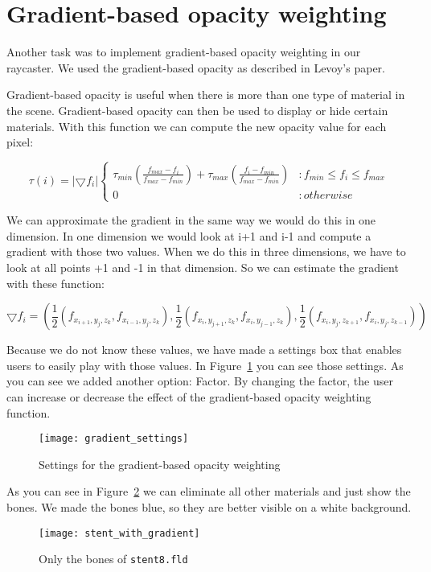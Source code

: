 \section{Gradient-based opacity weighting}\label{Sec:Gow}
Another task was to implement gradient-based opacity weighting in our raycaster.
We used the gradient-based opacity as described in Levoy’s paper.

Gradient-based opacity is useful when there is more than one type of  material in the scene. 
Gradient-based opacity can then be used to display or hide certain materials.
With this function we can compute the new opacity value for each pixel:

\[ \tau(i) = |\bigtriangledown f_{i}| \left\{
  \begin{array}{lr}
   \tau_{min} (\frac{ f_{max}- f_{i}}{ f_{max}- f_{min}}) +\tau_{max}( \frac{ f_{i}- f_{min}}{ f_{max}- f_{min}})  & : f_{min} \leq f_{i}  \leq f_{max} \\
    0 & : otherwise 
  \end{array}
\right.
\] 

We can approximate the gradient in the same way we would do this in one dimension. 
In one dimension we would look at i+1 and i-1 and compute a gradient with those two values.
When we do this in three dimensions, we have to look at all points +1 and -1 in that dimension.
So we can estimate the gradient with these function:

$$\bigtriangledown f_{i} = ( 
\frac{ 1}{2}( f_{x_{i+1},y_{j},z_{k}},f_{x_{i-1},y_{j},z_{k}} ),
\frac{ 1}{2}( f_{x_{i},y_{j+1},z_{k}},f_{x_{i},y_{j-1},z_{k}} ),
\frac{ 1}{2}( f_{x_{i},y_{j},z_{k+1}},f_{x_{i},y_{j},z_{k-1}} )) $$

Because we do not know these values, we have made a settings box that enables users to easily play with those values.
In Figure~\ref{fig:gradient_settings} you can see those settings. 
As you can see we added another option: Factor. 
By changing the factor, the user can increase or decrease the effect of the gradient-based opacity weighting function.

\begin{figure}[H]
	\centering
		\texttt{[image: gradient\_settings]}
		\caption{Settings for the gradient-based opacity weighting}
	\label{fig:gradient_settings}
\end{figure}

As you can see in Figure~\ref{fig:gradient} we can eliminate all other materials and just show the bones.
We made the bones blue, so they are better visible on a white background. 

\begin{figure}[H]
	\centering
		\texttt{[image: stent\_with\_gradient]}
		\caption{Only the bones of \texttt{stent8.fld}}
	\label{fig:gradient}
\end{figure}